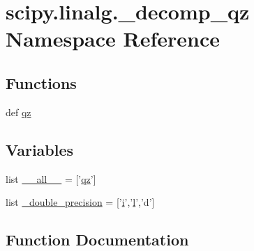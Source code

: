 \hypertarget{namespacescipy_1_1linalg_1_1__decomp__qz}{}\section{scipy.\+linalg.\+\_\+decomp\+\_\+qz Namespace Reference}
\label{namespacescipy_1_1linalg_1_1__decomp__qz}
\subsection*{Functions}
\begin{DoxyCompactItemize}
\item 
def \hyperlink{namespacescipy_1_1linalg_1_1__decomp__qz_a90c6ed0c2f793d2879cf15502d2778c6}{qz}
\end{DoxyCompactItemize}
\subsection*{Variables}
\begin{DoxyCompactItemize}
\item 
list \hyperlink{namespacescipy_1_1linalg_1_1__decomp__qz_ad6afb55518ac381c6cd149135ac89423}{\+\_\+\+\_\+all\+\_\+\+\_\+} = \mbox{[}'\hyperlink{namespacescipy_1_1linalg_1_1__decomp__qz_a90c6ed0c2f793d2879cf15502d2778c6}{qz}'\mbox{]}
\item 
list \hyperlink{namespacescipy_1_1linalg_1_1__decomp__qz_a8f04cb345ce9438d09ccc175dc20c1fa}{\+\_\+double\+\_\+precision} = \mbox{[}'\hyperlink{indexexpr_8h_aabd77643995707c185e95c8cb2782c81}{i}','\hyperlink{indexexpr_8h_a88aacdaa46b76729743ee33ef8b95a58}{l}','d'\mbox{]}
\end{DoxyCompactItemize}


\subsection{Function Documentation}
\hypertarget{namespacescipy_1_1linalg_1_1__decomp__qz_a90c6ed0c2f793d2879cf15502d2778c6}{}
